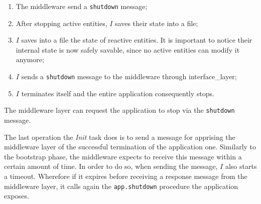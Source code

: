 \begin{enumerate}
  \item The middleware send a \verb|shutdown| message;
  \item After stopping active entities, $I$ saves their state into a file;
  \item $I$ saves into a file the state of reactive entities.
    It is important to notice their internal state is now safely savable,
    since no active entities can modify it anymore;
  \item $I$ sends a \texttt{shutdown} message to the middleware through
  interface\_layer;
  \item $I$ terminates itself and the entire application consequently stops.
\end{enumerate}

The middleware layer can request the application to stop via the
\texttt{shutdown} message.

The last operation the \textit{Init} task does is to send a message for
apprising the middleware layer of the successful termination of the
application one.
Similarly to the bootstrap phase, the middleware expects to receive this
message within a certain amount of time.
In order to do so, when sending the message, $I$ also starts a timeout.
Wherefore if it expires before receiving a response message from the
middleware layer, it calls again the \texttt{app.shutdown} procedure the
application exposes.
